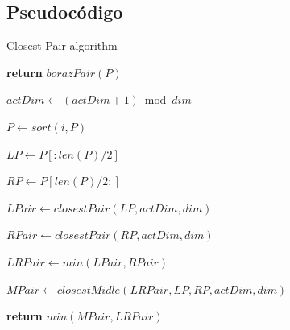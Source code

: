 \documentclass{article}
\begin{document}
	\subsection{Pseudocódigo}
		\begin{algorithm}[H]

			\caption{Closest Pair algorithm}

			\label{euclid}

			\begin{algorithmic}[1] %

			
					
					\State \textbf{return}  $borazPair(P)$

				\Else
					
					\State $actDim\gets(actDim+1) \bmod dim$ 	
					
					\State

					
					\State $P \gets sort(i, P)$
					
					\State
					
					\State $LP \gets P[:len(P)/2]$
					
					\State $RP \gets P[len(P)/2:]$
					
					\State
					
					\State $LPair \gets closestPair(LP, actDim, dim)$
					
					\State $RPair \gets closestPair(RP, actDim, dim)$
					
					\State $LRPair \gets min(LPair, RPair)$
					
					\State
					
					\State $MPair \gets closestMidle(LRPair, LP, RP, actDim, dim)$
					
					\State

					\State \textbf{return} $min(MPair, LRPair)$
				\EndIf
			
			\EndProcedure

			\end{algorithmic}

		\end{algorithm}
		
\end{document}
